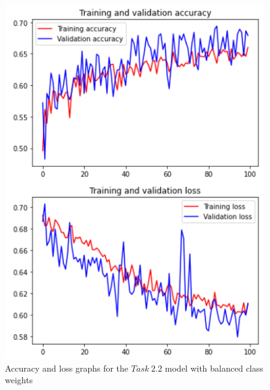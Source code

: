 \documentclass[11pt,a4paper,oneside]{article}
\begin{document}
\begin{figure}[h]
\centering
	\begin{minipage}[c]{.4\textwidth}
		\centering\setlength{\captionmargin}{0pt}%
		\includegraphics[width=.9\textwidth]{images/2.2/7_acc}
		\caption{Accuracy and loss graphs for the $Task\ 2.2$ model with balanced class weights}
		\label{fig:accuracy_2.2_1_weights}
	\end{minipage}
	\hspace{5mm}%
	\begin{minipage}[c]{.4\textwidth}
		\centering\setlength{\captionmargin}{0pt}%

\end{minipage}
\end{figure}
\end{document}

